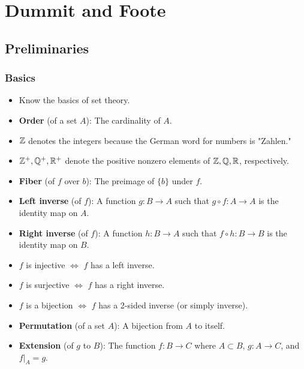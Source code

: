 \documentclass[../notes.tex]{subfiles}
\begin{document}
\part{Dummit and Foote}
\setcounter{chapter}{-1}
\chapter{Preliminaries}
\section{Basics}
\begin{itemize}
    \item {}Know the basics of set theory.
    \item \textbf{Order} (of a set $A$): The cardinality of $A$.
    \item $\mathbb{Z}$ denotes the integers because the German word for numbers is "Zahlen."
    \item $\mathbb{Z}^+,\mathbb{Q}^+,\mathbb{R}^+$ denote the positive nonzero elements of $\mathbb{Z},\mathbb{Q},\mathbb{R}$, respectively.
    \item \textbf{Fiber} (of $f$ over $b$): The preimage of $\{b\}$ under $f$.
    \item \textbf{Left inverse} (of $f$): A function $g:B\to A$ such that $g\circ f:A\to A$ is the identity map on $A$.
    \item \textbf{Right inverse} (of $f$): A function $h:B\to A$ such that $f\circ h:B\to B$ is the identity map on $B$.
    \item {}$f$ is injective $\Longleftrightarrow$ $f$ has a left inverse.
    \item $f$ is surjective $\Longleftrightarrow$ $f$ has a right inverse.
    \item $f$ is a bijection $\Longleftrightarrow$ $f$ has a 2-sided inverse (or simply inverse).
    \item \textbf{Permutation} (of a set $A$): A bijection from $A$ to itself.
    \item \textbf{Extension} (of $g$ to $B$): The function $f:B\to C$ where $A\subset B$, $g:A\to C$, and $f|_A=g$.
\end{itemize}
\end{document}
